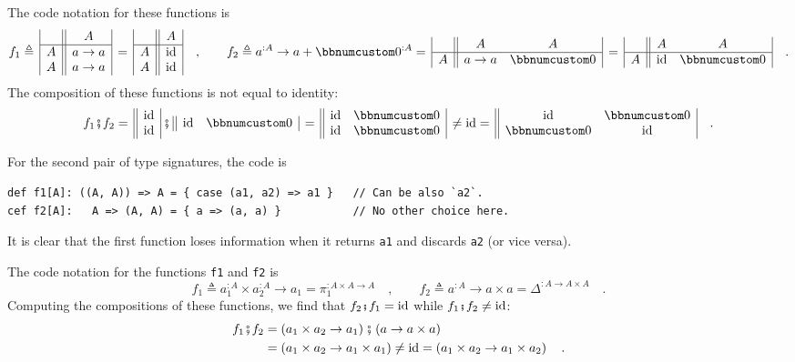 The code notation for these functions is
\[
f_{1}\triangleq\,\begin{array}{|c||c|}
 & A\\
\hline A & a\rightarrow a\\
A & a\rightarrow a
\end{array}\,=\,\begin{array}{|c||c|}
 & A\\
\hline A & \text{id}\\
A & \text{id}
\end{array}\quad,\quad\quad f_{2}\triangleq a^{:A}\rightarrow a+\bbnum 0^{:A}=\,\begin{array}{|c||cc|}
 & A & A\\
\hline A & a\rightarrow a & \bbnum 0
\end{array}\,=\,\begin{array}{|c||cc|}
 & A & A\\
\hline A & \text{id} & \bbnum 0
\end{array}\quad.
\]
The composition of these functions is not equal to identity:
\[
f_{1}\bef f_{2}=\,\begin{array}{||c|}
\text{id}\\
\text{id}
\end{array}\,\bef\,\begin{array}{||cc|}
\text{id} & \bbnum 0\end{array}\,=\,\begin{array}{||cc|}
\text{id} & \bbnum 0\\
\text{id} & \bbnum 0
\end{array}\,\neq\text{id}=\,\begin{array}{||cc|}
\text{id} & \bbnum 0\\
\bbnum 0 & \text{id}
\end{array}\quad.
\]

For the second pair of type signatures, the code is
\begin{lstlisting}
def f1[A]: ((A, A)) => A = { case (a1, a2) => a1 }   // Can be also `a2`.
cef f2[A]:   A => (A, A) = { a => (a, a) }           // No other choice here.
\end{lstlisting}
It is clear that the first function loses information when it returns
\lstinline!a1! and discards \lstinline!a2! (or vice versa).

The code notation for the functions \lstinline!f1! and \lstinline!f2!
is
\[
f_{1}\triangleq a_{1}^{:A}\times a_{2}^{:A}\rightarrow a_{1}=\pi_{1}^{:A\times A\rightarrow A}\quad,\quad\quad f_{2}\triangleq a^{:A}\rightarrow a\times a=\Delta^{:A\rightarrow A\times A}\quad.
\]
Computing the compositions of these functions, we find that $f_{2}\bef f_{1}=\text{id}$
while $f_{1}\bef f_{2}\ne\text{id}$:
\begin{align*}
f_{1}\bef f_{2} & =\left(a_{1}\times a_{2}\rightarrow a_{1}\right)\bef\left(a\rightarrow a\times a\right)\\
 & =\left(a_{1}\times a_{2}\rightarrow a_{1}\times a_{1}\right)\neq\text{id}=\left(a_{1}\times a_{2}\rightarrow a_{1}\times a_{2}\right)\quad.
\end{align*}

